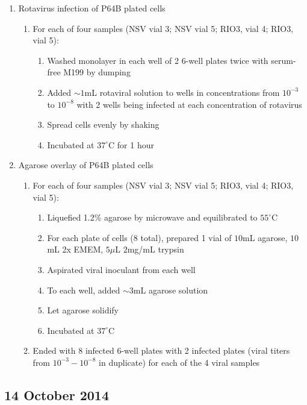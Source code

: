 \begin{enumerate}
	\item Rotavirus infection of P64B plated cells
		\begin{enumerate}
			\item For each of four samples (NSV vial 3; NSV vial 5; RIO3, vial 4; RIO3, vial 5):
				\begin{enumerate}
					\item Washed monolayer in each well of 2 6-well plates twice with serum-free M199 by dumping
					\item Added $\sim 1$mL rotaviral solution to wells in concentrations from $10^{-3}$ to $10^{-8}$ with 2 wells being infected at each concentration of rotavirus
					\item Spread cells evenly by shaking
					\item Incubated at $37^{\circ}$C for 1 hour
				\end{enumerate}
		\end{enumerate}
	\item Agarose overlay of P64B plated cells
		\begin{enumerate}
			\item For each of four samples (NSV vial 3; NSV vial 5; RIO3, vial 4; RIO3, vial 5):
				\begin{enumerate}
					\item Liquefied 1.2\% agarose by microwave and equilibrated to $55^{\circ}$C
					\item For each plate of cells (8 total), prepared 1 vial of $10$mL agarose, $10$mL 2x EMEM, $5\mu$L $2$mg/mL trypsin
					\item Aspirated viral inoculant from each well
					\item To each well, added $\sim3$mL agarose solution
					\item Let agarose solidify
					\item Incubated at $37^{\circ}$C
				\end{enumerate}
			\item Ended with 8 infected 6-well plates with 2 infected plates (viral titers from $10^{-3}-10^{-8}$ in duplicate) for each of the 4 viral samples
		\end{enumerate}
\end{enumerate}

\subsection*{14 October 2014}

